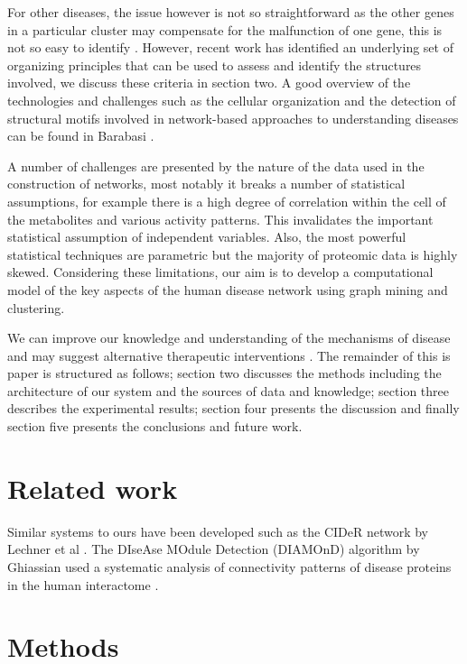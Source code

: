 \documentclass[authoryear,10pt,preprint]{elsarticle}
\begin{document}
For other diseases, the issue however is not so straightforward as the other genes in a particular cluster may compensate for the malfunction of one gene, this is not so easy to identify \citep{LeePark2008}.  However, recent work has identified an underlying set of organizing principles that can be used to assess and identify the structures involved, we discuss these criteria in section two. A good overview of the technologies and challenges such as the cellular organization and the detection of structural motifs involved in network-based approaches to understanding diseases can be found in Barabasi \citep{Barabasi2004}.  

A number of challenges are presented by the nature of the data used in the construction of networks, most notably it breaks a number of statistical assumptions, for example there is a high degree of correlation within the cell of the metabolites and various activity patterns. This invalidates the important statistical assumption of independent variables. Also, the most powerful statistical techniques are parametric but the majority of proteomic data is highly skewed. Considering these limitations, our aim is to develop a computational model of the key aspects of the human disease network using graph mining and clustering. 

We can improve our knowledge and understanding of the mechanisms of disease and may suggest alternative therapeutic interventions \citep{McGarry2017a,McGarry2017b}. The remainder of this is paper is structured as follows; section two discusses the methods including the architecture of our system and the sources of data and knowledge; section three describes the experimental  results; section four presents the discussion and finally section five presents the conclusions and future work. 

\section{Related work}
Similar systems to ours have been developed such as the CIDeR network by Lechner et al \citep{Lechner2012}. The {DI}se{A}se {MO}dule {D}etection ({DIAMOnD}) algorithm by Ghiassian used a systematic analysis of connectivity patterns of disease proteins in the human interactome \citep{Ghiassian2015}. 

\section{Methods}
\end{document}
